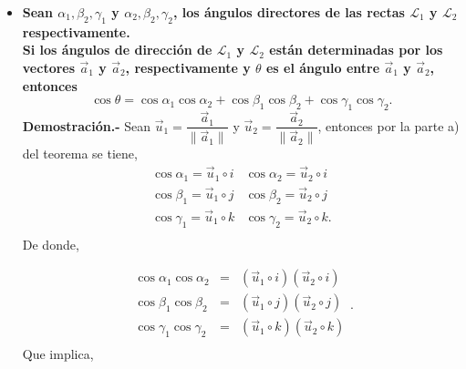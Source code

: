 

\begin{itemize}
    \item \textbf{\boldmath Sean $\alpha_1,\beta_2, \gamma_1$ y $\alpha_2,\beta_2,\gamma_2$, los ángulos directores de las rectas $\mathscr{L}_1$ y $\mathscr{L}_2$ respectivamente.\\
	Si los ángulos de dirección de $\mathscr{L}_1$ y $\mathscr{L}_2$ están determinadas por los vectores $\vec{a}_1$ y $\vec{a}_2$, respectivamente y $\theta$ es el ángulo entre $\vec{a}_1$ y $\vec{a}_2$, entonces
$$\cos \theta = \cos \alpha_1\cos \alpha_2 + \cos \beta_1 \cos \beta_2 + \cos \gamma_1 \cos \gamma_2.$$
	Demostración.-}\; Sean $\vec{u}_1=\dfrac{\vec{a}_1}{\|\vec{a}_1\|}$ y $\vec{u}_2=\dfrac{\vec{a}_2}{\|\vec{a}_2\|}$, entonces por la parte a) del teorema se tiene,
	$$\begin{array}{c|c}
	    \cos\alpha_1=\vec{u}_1 \circ i&\cos \alpha_2=\vec{u}_2\circ i\\
	    \cos\beta_1=\vec{u}_1 \circ j&\cos \beta_2=\vec{u}_2\circ j\\
	    \cos\gamma_1=\vec{u}_1 \circ k&\cos \gamma_2=\vec{u}_2\circ k.\\
	\end{array}$$
	De donde,

	$$\begin{array}{rcl}
	    \cos \alpha_1\cos \alpha_2&=&\left(\vec{u}_1\circ i\right)\left(\vec{u}_2\circ i\right)\\
	    \cos \beta_1\cos \beta_2&=&\left(\vec{u}_1\circ j\right)\left(\vec{u}_2\circ j\right)\\
	    \cos \gamma_1\cos \gamma_2&=&\left(\vec{u}_1\circ k\right)\left(\vec{u}_2\circ k\right)\\
	\end{array}.$$
	Que implica,


\end{itemize}
